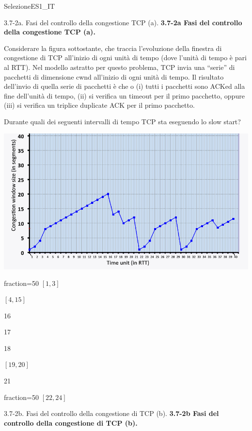 \documentclass[a4paper]{article}
\begin{document}
\begin{quiz}{SelezioneES1\_IT}
\begin{multi}[points=1,shuffle,multiple]{3.7-2a. Fasi del controllo della congestione TCP (a).}
\textbf{3.7-2a Fasi del controllo della congestione TCP (a).} 

Considerare la figura sottostante, che traccia l'evoluzione della finestra di congestione di TCP all'inizio di ogni unità di tempo (dove l'unità di tempo è pari al RTT). Nel modello astratto per questo problema, TCP invia una ``serie'' di pacchetti di dimensione cwnd all'inizio di ogni unità di tempo. Il risultato dell'invio di quella serie di pacchetti è che o (i) tutti i pacchetti sono ACKed alla fine dell'unità di tempo, (ii) si verifica un timeout per il primo pacchetto, oppure (iii) si verifica un triplice duplicate ACK per il primo pacchetto.

Durante quali dei seguenti intervalli di tempo TCP sta eseguendo lo slow start?
\begin{center}
\includegraphics[width=\linewidth]{figs/tcp_cc_evolution.jpg}
\end{center}

\item[fraction=50] $[1,3]$
\item $[4,15]$
\item 16
\item 17
\item 18
\item $[19,20]$
\item 21
\item[fraction=50] $[22,24]$
\end{multi}

\begin{multi}[points=1,shuffle,multiple]{3.7-2b. Fasi del controllo della congestione di TCP (b).}
\textbf{3.7-2b Fasi del controllo della congestione di TCP (b).}


\end{multi}
\end{quiz}
\end{document}
